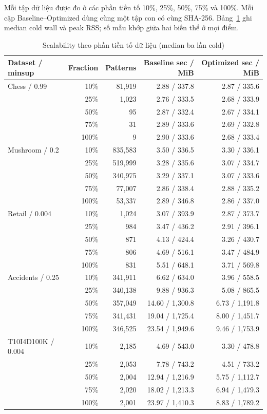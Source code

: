Mỗi tập dữ liệu được đo ở các phần tiền tố 10\%, 25\%, 50\%, 75\% và 100\%. Mỗi cặp Baseline--Optimized dùng cùng một tập con có cùng SHA-256. Bảng~\ref{tab:c2-IV} ghi median cold wall và peak RSS; số mẫu khớp giữa hai biến thể ở mọi điểm.

\begin{table}[!t]
\centering\footnotesize
\caption{Scalability theo phần tiền tố dữ liệu (median ba lần cold)}
\label{tab:c2-IV}
\setlength{\tabcolsep}{4pt}
\begin{tabular}{lrrrr}
\hline
\textbf{Dataset / minsup} & \textbf{Fraction} & \textbf{Patterns} & \textbf{Baseline sec / MiB} & \textbf{Optimized sec / MiB} \\ \hline
Chess / 0.99 & 10\% & 81,919 & 2.88 / 337.8 & 2.87 / 335.6 \\
 & 25\% & 1,023 & 2.76 / 333.5 & 2.68 / 333.9 \\
 & 50\% & 95 & 2.87 / 332.4 & 2.67 / 334.1 \\
 & 75\% & 31 & 2.89 / 333.6 & 2.69 / 332.8 \\
 & 100\% & 9 & 2.90 / 333.6 & 2.68 / 333.4 \\
Mushroom / 0.2 & 10\% & 835,583 & 3.50 / 336.5 & 3.30 / 336.1 \\
 & 25\% & 519,999 & 3.28 / 335.6 & 3.07 / 334.7 \\
 & 50\% & 340,975 & 3.29 / 337.1 & 3.07 / 333.6 \\
 & 75\% & 77,007 & 2.86 / 338.4 & 2.88 / 335.2 \\
 & 100\% & 53,337 & 2.89 / 346.8 & 2.86 / 337.0 \\
Retail / 0.004 & 10\% & 1,024 & 3.07 / 393.9 & 2.87 / 373.7 \\
 & 25\% & 984 & 3.47 / 436.2 & 2.91 / 396.1 \\
 & 50\% & 871 & 4.13 / 424.4 & 3.26 / 430.7 \\
 & 75\% & 806 & 4.69 / 516.1 & 3.47 / 484.9 \\
 & 100\% & 831 & 5.51 / 648.1 & 3.71 / 569.8 \\
Accidents / 0.25 & 10\% & 341,911 & 6.62 / 634.0 & 3.96 / 558.5 \\
 & 25\% & 340,138 & 9.88 / 936.3 & 5.08 / 865.5 \\
 & 50\% & 357,049 & 14.60 / 1,300.8 & 6.73 / 1,191.8 \\
 & 75\% & 341,431 & 19.04 / 1,725.4 & 8.00 / 1,451.7 \\
 & 100\% & 346,525 & 23.54 / 1,949.6 & 9.46 / 1,753.9 \\
T10I4D100K / 0.004 & 10\% & 2,185 & 4.69 / 543.0 & 3.30 / 478.8 \\
 & 25\% & 2,053 & 7.78 / 743.2 & 4.51 / 733.2 \\
 & 50\% & 2,004 & 12.94 / 1,216.9 & 5.75 / 1,112.7 \\
 & 75\% & 2,020 & 18.02 / 1,213.3 & 6.94 / 1,479.3 \\
 & 100\% & 2,001 & 23.97 / 1,410.3 & 8.83 / 1,789.2 \\
\hline
\end{tabular}
\end{table}

